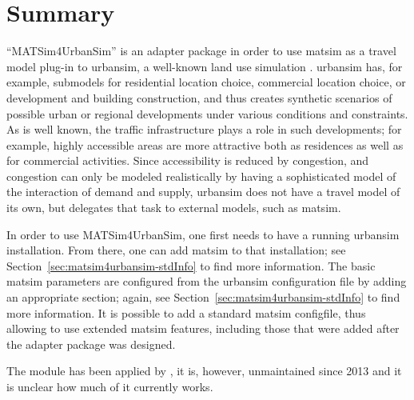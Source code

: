 \section{Summary}
``MATSim4UrbanSim'' is an adapter package in order to use \gls{matsim} as a travel model plug-in to \gls{urbansim}, a well-known land use simulation \citep[e.g.][see \url{http://www.urbansim.org}]{WaddellEtc2003UrbanSim}.
\gls{urbansim} has, for example, submodels for residential location choice, commercial location choice, or development and building construction, and thus creates synthetic scenarios of possible urban or regional developments under various conditions and constraints. 
As is well known, the traffic infrastructure plays a role in such developments; for example, highly accessible areas are more attractive both as residences as well as for commercial activities. 
Since accessibility is reduced by congestion, and congestion can only be modeled realistically by having a sophisticated model of the interaction of demand and supply, \gls{urbansim} does not have a travel model of its own, but delegates that task to external models, such as \gls{matsim}.

In order to use MATSim4UrbanSim, one first needs to have a running \gls{urbansim} installation. 
From there, one can add \gls{matsim} to that installation; see Section~\ref{sec:matsim4urbansim-stdInfo} to find more information. 
The basic \gls{matsim} parameters are configured from the \gls{urbansim} configuration file by adding an appropriate section; again, see Section~\ref{sec:matsim4urbansim-stdInfo} to find more information. 
It is possible to add a standard \gls{matsim} \gls{configfile}, thus allowing to use extended \gls{matsim} features, including those that were added after the adapter package was designed.

The module has been applied by \citet[][]{ZoelligRenner_PhDThesis_2014}, it is, however, unmaintained since 2013 and it is unclear how much of it currently works.





